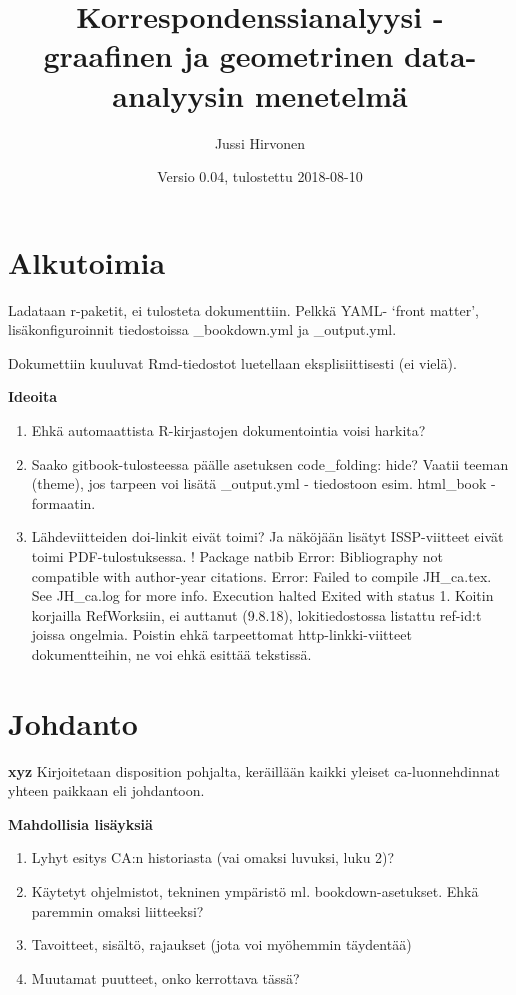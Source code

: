 \documentclass[finnish,]{book}
\title{Korrespondenssianalyysi - graafinen ja geometrinen data-analyysin
menetelmä}
\author{Jussi Hirvonen}
\date{Versio 0.04, tulostettu 2018-08-10}
\begin{document}
\maketitle

{
\setcounter{tocdepth}{1}
\tableofcontents
}
\hypertarget{alkutoimia}{%
\chapter*{Alkutoimia}\label{alkutoimia}}

Ladataan r-paketit, ei tulosteta dokumenttiin. Pelkkä YAML- `front
matter', lisäkonfiguroinnit tiedostoissa \_bookdown.yml ja \_output.yml.

Dokumettiin kuuluvat Rmd-tiedostot luetellaan eksplisiittisesti (ei
vielä).

\textbf{Ideoita}

\begin{enumerate}
\def\labelenumi{\arabic{enumi}.}
\item
  Ehkä automaattista R-kirjastojen dokumentointia voisi harkita?
\item
  Saako gitbook-tulosteessa päälle asetuksen code\_folding: hide? Vaatii
  teeman (theme), jos tarpeen voi lisätä \_output.yml - tiedostoon esim.
  html\_book - formaatin.
\item
  Lähdeviitteiden doi-linkit eivät toimi? Ja näköjään lisätyt
  ISSP-viitteet eivät toimi PDF-tulostuksessa. ! Package natbib Error:
  Bibliography not compatible with author-year citations. Error: Failed
  to compile JH\_ca.tex. See JH\_ca.log for more info. Execution halted
  Exited with status 1. Koitin korjailla RefWorksiin, ei auttanut
  (9.8.18), lokitiedostossa listattu ref-id:t joissa ongelmia. Poistin
  ehkä tarpeettomat http-linkki-viitteet dokumentteihin, ne voi ehkä
  esittää tekstissä.
\end{enumerate}

\hypertarget{johdanto}{%
\chapter{Johdanto}\label{johdanto}}

\textbf{xyz} Kirjoitetaan disposition pohjalta, keräillään kaikki
yleiset ca-luonnehdinnat yhteen paikkaan eli johdantoon.

\textbf{Mahdollisia lisäyksiä}

\begin{enumerate}
\def\labelenumi{\arabic{enumi}.}
\item
  Lyhyt esitys CA:n historiasta (vai omaksi luvuksi, luku 2)?
\item
  Käytetyt ohjelmistot, tekninen ympäristö ml. bookdown-asetukset. Ehkä
  paremmin omaksi liitteeksi?
\item
  Tavoitteet, sisältö, rajaukset (jota voi myöhemmin täydentää)
\item
  Muutamat puutteet, onko kerrottava tässä?
\end{enumerate}
\end{document}
